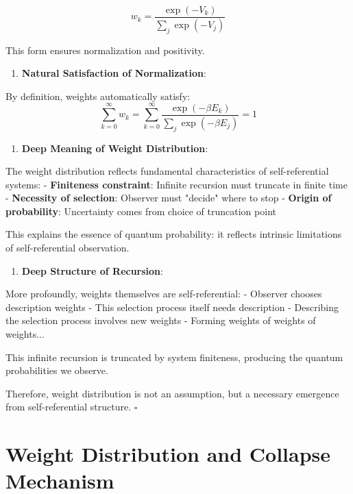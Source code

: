 \begin{equation}
w_k = \frac{\exp(-V_k)}{\sum_{j} \exp(-V_j)}
\end{equation}
   
   This form ensures normalization and positivity.

\begin{enumerate}
\item \textbf{Natural Satisfaction of Normalization}:
\end{enumerate}
   
   By definition, weights automatically satisfy:
\begin{equation}
\sum_{k=0}^{\infty} w_k = \sum_{k=0}^{\infty} \frac{\exp(-\beta E_k)}{\sum_{j} \exp(-\beta E_j)} = 1
\end{equation}

\begin{enumerate}
\item \textbf{Deep Meaning of Weight Distribution}:
\end{enumerate}
   
   The weight distribution reflects fundamental characteristics of self-referential systems:
   - \textbf{Finiteness constraint}: Infinite recursion must truncate in finite time
   - \textbf{Necessity of selection}: Observer must "decide" where to stop
   - \textbf{Origin of probability}: Uncertainty comes from choice of truncation point
   
   This explains the essence of quantum probability: it reflects intrinsic limitations of self-referential observation.

\begin{enumerate}
\item \textbf{Deep Structure of Recursion}:
\end{enumerate}
   
   More profoundly, weights themselves are self-referential:
   - Observer chooses description weights
   - This selection process itself needs description
   - Describing the selection process involves new weights
   - Forming weights of weights of weights...
   
   This infinite recursion is truncated by system finiteness, producing the quantum probabilities we observe.

Therefore, weight distribution is not an assumption, but a necessary emergence from self-referential structure. $\square$

\section{Weight Distribution and Collapse Mechanism}
\label{sec:ch05_quantum:weight-distribution-and-collapse-mechanism}

